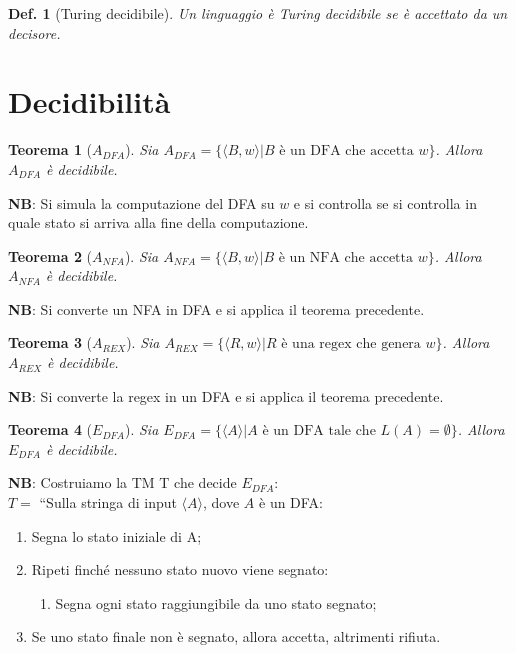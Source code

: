 \documentclass[11pt]{article}
\newtheorem{definition}{Def.}[section]
\newtheorem{theorem}{Teorema}[section]
\begin{document}
\begin{definition}[Turing decidibile]
	Un linguaggio è Turing decidibile se è accettato da un decisore.
\end{definition}

\section{Decidibilità}

\begin{theorem}[$A_{DFA}$]
	Sia $A_{DFA} = \{\langle B, w \rangle | B \text{ è un DFA che accetta } 
	w\}$. Allora $A_{DFA}$ è decidibile.
\end{theorem}

\textbf{NB}: Si simula la computazione del DFA su $w$ e si controlla se si
controlla in quale stato si arriva alla fine della computazione.

\begin{theorem}[$A_{NFA}$]
	Sia $A_{NFA} = \{\langle B, w \rangle | B \text{ è un NFA che accetta } 
	w\}$. Allora $A_{NFA}$ è decidibile.
\end{theorem}

\textbf{NB}: Si converte un NFA in DFA e si applica il teorema precedente.

\begin{theorem}[$A_{REX}$]
	Sia $A_{REX} = \{\langle R, w \rangle | R \text{ è una regex che genera } 
	w\}$. Allora $A_{REX}$ è decidibile.
\end{theorem}

\textbf{NB}: Si converte la regex in un DFA e si applica il teorema precedente.

\begin{theorem}[$E_{DFA}$]
	Sia $E_{DFA} = \{\langle A \rangle | A \text{ è un DFA tale che } L(A) = 
	\emptyset\}$. Allora $E_{DFA}$ è decidibile.
\end{theorem}

\textbf{NB}: Costruiamo la TM T che decide $E_{DFA}$:\\

$T = $ ``Sulla stringa di input $\langle A \rangle$, dove $A$ è un DFA:
\begin{enumerate}
	\item Segna lo stato iniziale di A;
	\item Ripeti finché nessuno stato nuovo viene segnato:
	\begin{enumerate}
		\item Segna ogni stato raggiungibile da uno stato segnato;
	\end{enumerate}
	\item Se uno stato finale non è segnato, allora accetta, altrimenti rifiuta.
\end{enumerate}
\end{document}
